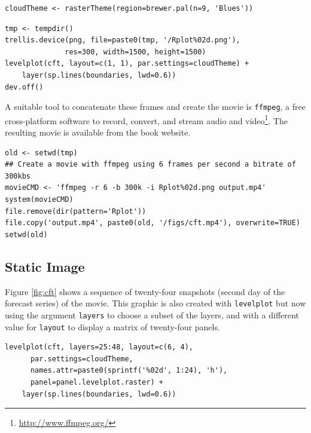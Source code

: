 \documentclass[smallroyalvopaper]{memoir}
\begin{document}
\lstset{language=R,numbers=none}
\begin{lstlisting}
cloudTheme <- rasterTheme(region=brewer.pal(n=9, 'Blues'))
\end{lstlisting}


\lstset{language=R,numbers=none}
\begin{lstlisting}
tmp <- tempdir()
trellis.device(png, file=paste0(tmp, '/Rplot%02d.png'),
		      res=300, width=1500, height=1500)
levelplot(cft, layout=c(1, 1), par.settings=cloudTheme) +
    layer(sp.lines(boundaries, lwd=0.6))
dev.off()
\end{lstlisting}

A suitable tool to concatenate these frames and create the movie is
\texttt{ffmpeg}, a free cross-platform software to record, convert, and stream
audio and video\footnote{\url{http://www.ffmpeg.org/}}. The resulting movie is available from the book
website.


\lstset{language=R,numbers=none}
\begin{lstlisting}
old <- setwd(tmp)
## Create a movie with ffmpeg using 6 frames per second a bitrate of 300kbs
movieCMD <- 'ffmpeg -r 6 -b 300k -i Rplot%02d.png output.mp4'
system(movieCMD)
file.remove(dir(pattern='Rplot'))
file.copy('output.mp4', paste0(old, '/figs/cft.mp4'), overwrite=TRUE)
setwd(old)
\end{lstlisting}
\subsection{Static Image}
\label{sec-5-4}
Figure \ref{fig:cft} shows a sequence of twenty-four snapshots (second day
of the forecast series) of the movie. This graphic is also created
with \texttt{levelplot} but now using the argument \texttt{layers} to choose a
subset of the layers, and with a different value for \texttt{layout} to
display a matrix of twenty-four panels.
\lstset{language=R,numbers=none}
\begin{lstlisting}
levelplot(cft, layers=25:48, layout=c(6, 4),
	  par.settings=cloudTheme,
	  names.attr=paste0(sprintf('%02d', 1:24), 'h'),
	  panel=panel.levelplot.raster) +
    layer(sp.lines(boundaries, lwd=0.6))
\end{lstlisting}
\end{document}
